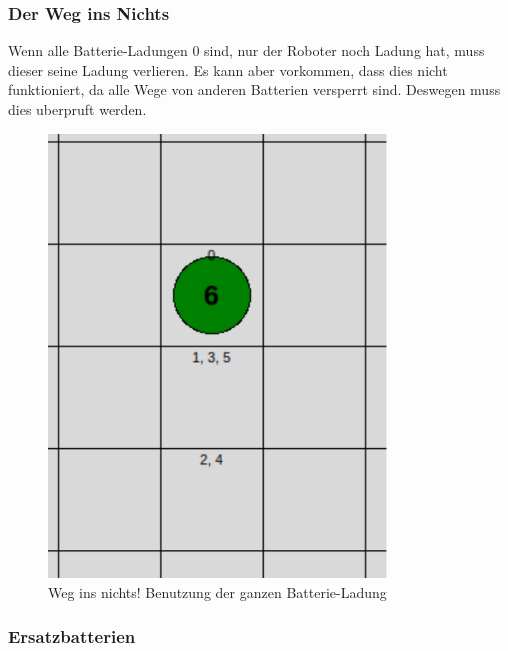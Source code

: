 \documentclass[a4paper,12pt,arial]{scrartcl}
\begin{document}
\subsubsection{Der Weg ins Nichts}
Wenn alle Batterie-Ladungen 0 sind, nur der Roboter noch Ladung hat, muss dieser seine Ladung verlieren. Es kann aber vorkommen, dass dies nicht funktioniert, da alle Wege von anderen Batterien versperrt sind. Deswegen muss dies uberpruft werden.
\begin{figure}[h]
    \centering
    \includegraphics[width=0.8\textwidth]{way_ins_nothing.pdf}
    \caption{Weg ins nichts! Benutzung der ganzen Batterie-Ladung}
    \label{fig:way_to_nothing}
\end{figure}

\subsubsection{Ersatzbatterien}
\end{document}
